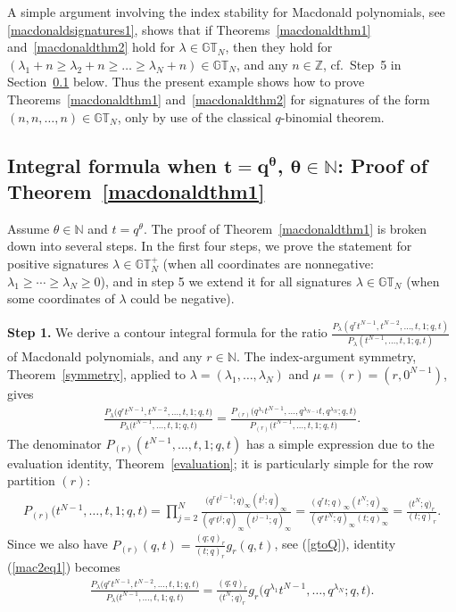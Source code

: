 \documentclass[pdftex]{sigma}
\numberwithin{equation}{section}
\newcommand{\Z}{\mathbb{Z}}
\newcommand{\N}{\mathbb{N}}
\newcommand{\GT}{\mathbb{GT}}
\newcommand{\GTp}{\mathbb{GT}^+}
\begin{document}
A simple argument involving the index stability for Macdonald polynomials, see \eqref{macdonaldsignatures1}, shows that if Theorems~\ref{macdonaldthm1} and~\ref{macdonaldthm2} hold for $\lambda\in\GT_N$, then they hold for $(\lambda_1 + n \geq \lambda_2 + n \geq \dots \geq \lambda_N + n)\in\GT_N$, and any $n\in\Z$, cf.\ Step~5 in Section~\ref{proofthm1macdonald} below. Thus the present example shows how to prove Theorems~\ref{macdonaldthm1} and~\ref{macdonaldthm2} for signatures of the form $(n, n, \dots, n)\in\GT_N$, only by use of the classical $q$-binomial theorem.


\subsection[Integral formula when $t = q^{\theta}$, $\theta\in\N$: Proof of Theorem~\ref{macdonaldthm1}]{Integral formula when $\boldsymbol{t = q^{\theta}}$, $\boldsymbol{\theta\in\N}$: Proof of Theorem~\ref{macdonaldthm1}}\label{proofthm1macdonald}

Assume $\theta\in\N$ and $t = q^{\theta}$. The proof of Theorem~\ref{macdonaldthm1} is broken down into several steps. In the f\/irst four steps, we prove the statement for positive signatures $\lambda\in\GTp_N$ (when all coordinates are nonnegative: $\lambda_1 \geq \cdots \geq \lambda_N \geq 0$), and in step 5 we extend it for all signatures $\lambda\in\GT_N$ (when some coordinates of $\lambda$ could be negative).

\textbf{Step 1.} We derive a contour integral formula for the ratio $\frac{P_{\lambda}(q^rt^{N-1}, t^{N-2}, \dots, t, 1; q, t)}{P_{\lambda}(t^{N-1}, \dots, t, 1; q, t)}$ of Macdonald polynomials, and any $r\in\N$. The index-argument symmetry, Theorem~\ref{symmetry}, applied to $\lambda = (\lambda_1, \dots, \lambda_N)$ and $\mu = (r) = (r, 0^{N-1})$, gives
\begin{gather}\label{mac2eq1}
\frac{P_{\lambda}\big(q^rt^{N-1}, t^{N-2}, \dots, t, 1; q, t\big)}{P_{\lambda}\big(t^{N-1}, \dots, t, 1; q, t\big)} = \frac{P_{(r)}\big(q^{\lambda_1}t^{N-1}, \dots, q^{\lambda_{N-1}}t, q^{\lambda_N}; q, t\big)}{P_{(r)}\big(t^{N-1}, \dots, t, 1; q, t\big)}.
\end{gather}
The denominator $P_{(r)}(t^{N-1}, \dots, t, 1; q, t)$ has a simple expression due to the evaluation identity, Theorem~\ref{evaluation}; it is particularly simple for the row partition $(r)$:
\begin{gather*}
P_{(r)}\big(t^{N-1}, \dots, t, 1; q, t\big) = \prod_{j=2}^N{\frac{\big(q^{r}t^{j-1}; q\big)_{\infty}(t^j; q)_{\infty}}{(q^rt^j; q)_{\infty}(t^{j-1}; q)_{\infty}}} = {\frac{(q^rt; q)_{\infty}(t^N; q)_{\infty}}{(q^rt^N; q)_{\infty}(t; q)_{\infty}}} = \frac{\big(t^N; q\big)_r}{(t; q)_r}.
\end{gather*}
Since we also have $P_{(r)}(q, t) = \frac{(q; q)_r}{(t; q)_r}g_r(q, t)$, see (\ref{gtoQ}), identity (\ref{mac2eq1}) becomes
\begin{gather}\label{mac2eq0}
\frac{P_{\lambda}\big(q^rt^{N-1}, t^{N-2}, \dots, t, 1; q, t\big)}{P_{\lambda}\big(t^{N-1}, \dots, t, 1; q, t\big)} = \frac{(q; q)_r}{\big(t^N; q\big)_r} g_r\big(q^{\lambda_1}t^{N-1}, \dots, q^{\lambda_N}; q, t\big).
\end{gather}
\end{document}
